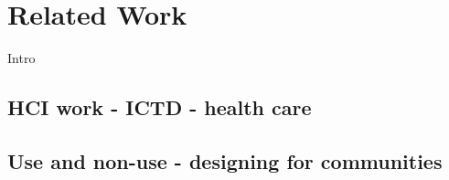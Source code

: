 \section{Related Work}
Intro

\subsection{HCI work - ICTD - health care}

\subsection{Use and non-use - designing for communities}
